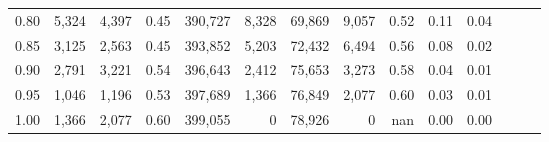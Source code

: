 \begin{tabular}{rrrrrrrrrrrrrr}
0.80 &   5,324 &  4,397 &  0.45 &  390,727 &    8,328 &  69,869 &   9,057 &  0.52 &  0.11 &      0.04 \\
0.85 &   3,125 &  2,563 &  0.45 &  393,852 &    5,203 &  72,432 &   6,494 &  0.56 &  0.08 &      0.02 \\
0.90 &   2,791 &  3,221 &  0.54 &  396,643 &    2,412 &  75,653 &   3,273 &  0.58 &  0.04 &      0.01 \\
0.95 &   1,046 &  1,196 &  0.53 &  397,689 &    1,366 &  76,849 &   2,077 &  0.60 &  0.03 &      0.01 \\
1.00 &   1,366 &  2,077 &  0.60 &  399,055 &        0 &  78,926 &       0 &   nan &  0.00 &      0.00 \\
\bottomrule
\end{tabular}

